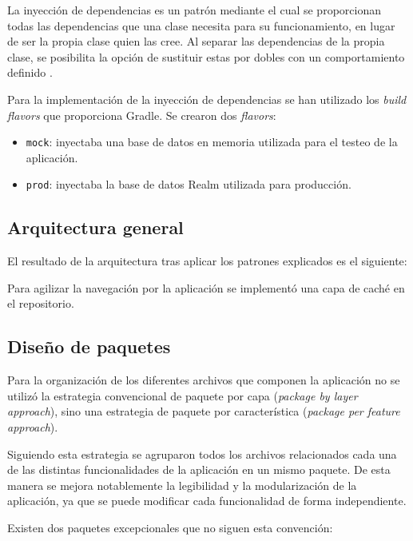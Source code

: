 La inyección de dependencias es un patrón mediante el cual se
proporcionan todas las dependencias que una clase necesita para su
funcionamiento, en lugar de ser la propia clase quien las cree. Al
separar las dependencias de la propia clase, se posibilita la opción de
sustituir estas por dobles con un comportamiento definido
\citep{wiki:injection}.

Para la implementación de la inyección de dependencias se han utilizado
los \emph{build flavors} que proporciona Gradle. Se crearon dos
\emph{flavors}:

\begin{itemize}
\tightlist
\item
  \texttt{mock}: inyectaba una base de datos en memoria utilizada para el testeo
  de la aplicación.
\item
  \texttt{prod}: inyectaba la base de datos Realm utilizada para producción.
\end{itemize}

\subsection{Arquitectura general}\label{arquitectura-general}

El resultado de la arquitectura tras aplicar los patrones explicados es
el siguiente:


Para agilizar la navegación por la aplicación se implementó una capa de
caché en el repositorio.

\subsection{Diseño de paquetes}\label{diseno-de-paquetes}

Para la organización de los diferentes archivos que componen la
aplicación no se utilizó la estrategia convencional de paquete por capa
(\emph{package by layer approach}), sino una estrategia de paquete por
característica (\emph{package per feature approach}).

Siguiendo esta estrategia se agruparon todos los archivos relacionados
cada una de las distintas funcionalidades de la aplicación en un mismo
paquete. De esta manera se mejora notablemente la legibilidad y la
modularización de la aplicación, ya que se puede modificar cada
funcionalidad de forma independiente.

Existen dos paquetes excepcionales que no siguen esta convención:

